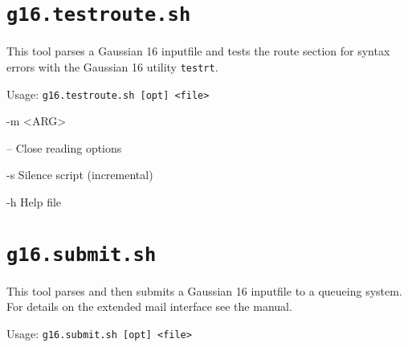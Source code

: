 \documentclass[   %
  final,          %
  a4paper,        %
  rscols=3,       %
  margin=1.0cm,   %
]{refsheet}
\begin{document}
\section{\texttt{g16.testroute.sh}}

This tool parses a Gaussian 16 inputfile and 
tests the route section for syntax errors 
with the Gaussian 16 utility \texttt{testrt}.

Usage: \texttt{g16.testroute.sh [opt] <file>}

\begin{rslisttt}{-m <ARG>}
  \item[--      ] Close reading options
  \item[-s      ] Silence script (incremental)
  \item[-h      ] Help file 
\end{rslisttt}

\section{\texttt{g16.submit.sh}}

This tool parses and then submits a Gaussian 16 inputfile to a queueing system.
For details on the extended mail interface see the manual.

Usage: \texttt{g16.submit.sh [opt] <file>}
\end{document}
